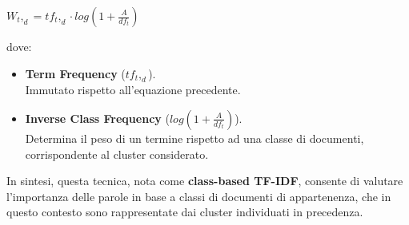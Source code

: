 \begin{itemize}
    \begin{center}
        $W_t,_d = tf_t,_d \cdot log(1+\frac{A}{df_t})$
    \end{center}
    dove:
    \begin{itemize}
        \renewcommand{\labelitemi}{-}
        \item \textbf{Term Frequency} ($tf_t,_d$). \\
        Immutato rispetto all'equazione precedente.        
        \item \textbf{Inverse Class Frequency} ($log(1+\frac{A}{df_t})$). \\ 
        Determina il peso di un termine rispetto ad una classe di documenti, corrispondente al cluster considerato.
    \end{itemize}
    In sintesi, questa tecnica, nota come \textbf{class-based TF-IDF}, consente di valutare l'importanza delle parole in base a classi di documenti di appartenenza, che in questo contesto sono rappresentate dai cluster individuati in precedenza.
\end{itemize}